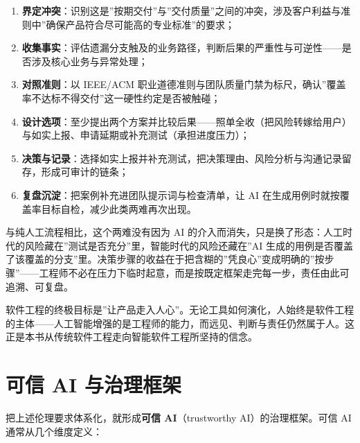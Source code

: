 \documentclass[
]{ctexbook}
\providecommand{\tightlist}{\setlength{\itemsep}{0pt}\setlength{\parskip}{0pt} }
\begin{document}
\begin{enumerate}
\def\labelenumi{\arabic{enumi}.}
\tightlist
\item
  \textbf{界定冲突}：识别这是''按期交付''与''交付质量''之间的冲突，涉及客户利益与准则中''确保产品符合尽可能高的专业标准''的要求；
\item
  \textbf{收集事实}：评估遗漏分支触及的业务路径，判断后果的严重性与可逆性------是否涉及核心业务与异常处理；
\item
  \textbf{对照准则}：以 IEEE/ACM
  职业道德准则与团队质量门禁为标尺，确认''覆盖率不达标不得交付''这一硬性约定是否被触碰；
\item
  \textbf{设计选项}：至少提出两个方案并比较后果------照单全收（把风险转嫁给用户）与如实上报、申请延期或补充测试（承担进度压力）；
\item
  \textbf{决策与记录}：选择如实上报并补充测试，把决策理由、风险分析与沟通记录留存，形成可审计的链条；
\item
  \textbf{复盘沉淀}：把案例补充进团队提示词与检查清单，让 AI
  在生成用例时就按覆盖率目标自检，减少此类两难再次出现。
\end{enumerate}

与纯人工流程相比，这个两难没有因为 AI
的介入而消失，只是换了形态：人工时代的风险藏在''测试是否充分''里，智能时代的风险还藏在''AI
生成的用例是否覆盖了该覆盖的分支''里。决策步骤的收益在于把含糊的''凭良心''变成明确的''按步骤''------工程师不必在压力下临时起意，而是按既定框架走完每一步，责任由此可追溯、可复盘。

软件工程的终极目标是''让产品走入人心''。无论工具如何演化，人始终是软件工程的主体------人工智能增强的是工程师的能力，而远见、判断与责任仍然属于人。这正是本书从传统软件工程走向智能软件工程所坚持的信念。

\section{可信 AI
与治理框架}\label{ux53efux4fe1-ai-ux4e0eux6cbbux7406ux6846ux67b6}

把上述伦理要求体系化，就形成\textbf{可信 AI}（trustworthy
AI）的治理框架。可信 AI 通常从几个维度定义：
\end{document}
